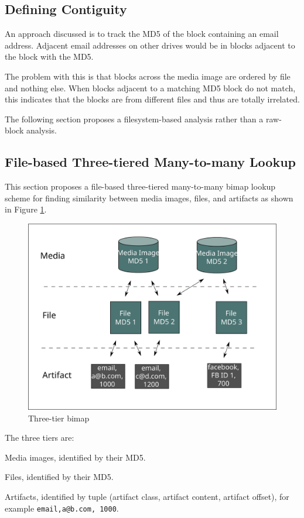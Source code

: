 \documentclass[12pt,twoside]{article}
\begin{document}
\subsection*{Defining Contiguity}
An approach discussed is to track the MD5 of the block containing an email address.  Adjacent email addresses on other drives would be in blocks adjacent to the block with the MD5.

The problem with this is that blocks across the media image are ordered by file and nothing else.  When blocks adjacent to a matching MD5 block do not match, this indicates that the blocks are from different files and thus are totally irrelated.

The following section proposes a filesystem-based analysis rather than a raw-block analysis.

\subsection*{File-based Three-tiered Many-to-many Lookup}
This section proposes a file-based three-tiered many-to-many bimap lookup scheme for finding similarity between media images, files, and artifacts as shown in Figure \ref{fig:threeTierBimap}.

\begin{figure}
	\center
	\includegraphics[scale=.45]{three_tier_bimap}
	\caption{Three-tier bimap}
	\label{fig:threeTierBimap}
\end{figure}

The three tiers are:
\begin{compactitem}
\item Media images, identified by their MD5.
\item Files, identified by their MD5.
\item Artifacts, identified by tuple (artifact class, artifact content, artifact offset), for example \texttt{email,a@b.com, 1000}.
\end{compactitem}
\end{document}
